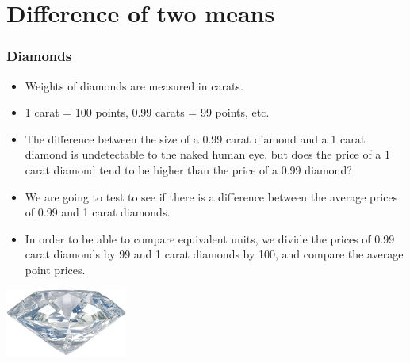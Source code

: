 
\section{Difference of two means}


\begin{frame}
\frametitle{Diamonds}

\begin{itemize}

\item Weights of diamonds are measured in carats. 

\item 1 carat = 100 points, 0.99 carats = 99 points, etc.

\item The difference between the size of a 0.99 carat diamond and a 1 carat diamond is undetectable to the naked human eye, but does the price of a 1 carat diamond tend to be higher than the price of a 0.99 diamond?

\item We are going to test to see if there is a difference between the average prices of 0.99 and 1 carat diamonds.

\item In order to be able to compare equivalent units, we divide the prices of 0.99 carat diamonds by 99 and 1 carat diamonds by 100, and compare the average point prices.

\end{itemize}

\hfill \includegraphics[width=0.3\textwidth]{5-3_diff_two_mean/figures/diamonds/diamond}

\end{frame}


